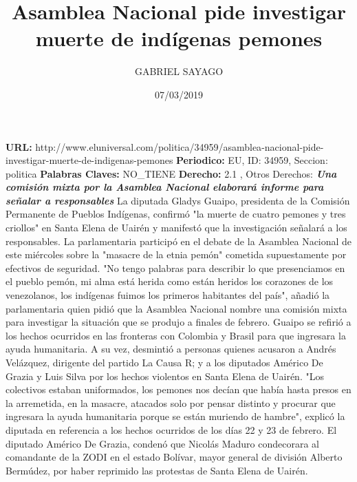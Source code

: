 \documentclass{article}%
\title{\textbf{Asamblea Nacional pide investigar muerte de indígenas pemones}}%
\author{GABRIEL SAYAGO}%
\date{07/03/2019}%
\begin{document}
%
\normalsize%
\maketitle%
\textbf{URL: }%
http://www.eluniversal.com/politica/34959/asamblea{-}nacional{-}pide{-}investigar{-}muerte{-}de{-}indigenas{-}pemones\newline%
%
\textbf{Periodico: }%
EU, %
ID: %
34959, %
Seccion: %
politica\newline%
%
\textbf{Palabras Claves: }%
NO\_TIENE\newline%
%
\textbf{Derecho: }%
2.1%
, Otros Derechos: %
\newline%
%
\textbf{\textit{Una comisión mixta por la Asamblea Nacional elaborará informe para señalar a responsables}}%
\newline%
\newline%
%
La diputada Gladys Guaipo, presidenta de la Comisión Permanente de Pueblos Indígenas, confirmó "la muerte de cuatro pemones y tres criollos" en  Santa Elena de Uairén y manifestó que la investigación señalará a los responsables.%
\newline%
%
La parlamentaria participó en el debate de la Asamblea Nacional de este miércoles sobre la "masacre de la etnia pemón" cometida supuestamente por efectivos de seguridad.%
\newline%
%
"No tengo palabras para describir lo que presenciamos en el pueblo pemón, mi alma está herida como están heridos los corazones de los venezolanos, los indígenas fuimos los primeros habitantes del país", añadió la parlamentaria quien pidió que la Asamblea Nacional  nombre una comisión mixta para investigar la situación que se produjo a finales de febrero.%
\newline%
%
Guaipo se refirió a los hechos ocurridos en las fronteras con Colombia y Brasil para que ingresara la ayuda humanitaria. A su vez, desmintió a personas quienes acusaron a Andrés Velázquez, dirigente del partido La Causa R; y a los diputados Américo De Grazia y Luis Silva por los hechos violentos en Santa Elena de Uairén.%
\newline%
%
"Los colectivos estaban uniformados, los pemones nos decían que había hasta presos en la arremetida, en la masacre, atacados solo por pensar distinto y procurar que ingresara la ayuda humanitaria porque se están muriendo de hambre", explicó la diputada en referencia a los hechos ocurridos de los días 22 y 23 de febrero.%
\newline%
%
El diputado Américo De Grazia, condenó que Nicolás Maduro condecorara al comandante de la ZODI en el estado Bolívar, mayor general de división Alberto Bermúdez, por haber reprimido las protestas de Santa Elena de Uairén.%
\end{document}
